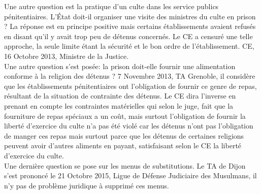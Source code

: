 \documentclass[10pt, a4paper, openany]{book}
\begin{document}
Une autre question est la pratique d'un culte dans les service publics pénitentiaires. L'État doit-il organiser une visite des ministres du culte en prison ? La réponse est en principe positive mais certains établissements avaient refusés en disant qu'il y avait trop peu de détenus concernés. Le CE a censuré une telle approche, la seule limite étant la sécurité et le bon ordre de l'établissement. CE, 16 Octobre 2013, Ministre de la Justice. \\
Une autre question s'est posée: la prison doit-elle fournir une alimentation conforme à la religion des détenus ? 7 Novembre 2013, TA Grenoble, il considère que les établissements pénitentiaires ont l'obligation de fournir ce genre de repas, résultant de la situation de contrainte des détenus. Le CE dira l'inverse en prenant en compte les contraintes matérielles qui selon le juge, fait que la fourniture de repas spéciaux a un coût, mais surtout l'obligation de fournir la liberté d'exercice du culte n'a pas été violé car les détenus n'ont pas l'obligation de manger ces repas mais surtout parce que les détenus de certaines religions peuvent avoir d'autres aliments en payant, satisfaisant selon le CE la liberté d'exercice du culte. \\
Une dernière question se pose sur les menus de substitutions. Le TA de Dijon s'est prononcé le 21 Octobre 2015, Ligue de Défense Judiciaire des Musulmans, il n'y pas de problème juridique à supprimé ces menus. 
\end{document}
